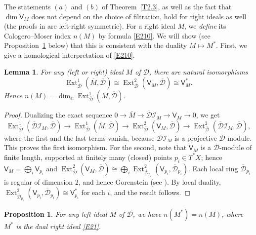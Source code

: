 \documentclass[11pt,reqno]{amsart}
\theoremstyle{plain}
\newtheorem{lemma}{Lemma}[section]
\newtheorem{proposition}{Proposition}[section]
\theoremstyle{definition}
\theoremstyle{remark}
\numberwithin{equation}{section}
\newcommand{\cD}{\mathcal{D}}
\newcommand{\C}{\mathbb{C}}
\newcommand{\bD}{\overline{\cD}}
\newcommand{\bM}{\overline{M}}
\DeclareMathOperator{\Ext}{Ext}
\begin{document}
The statements $(a)$ and $(b)$ of Theorem~\ref{T2.3}, as well as the fact that
$\dim \mathsf{V}_M$ does not depend on the choice of filtration, hold for right ideals as well (the proofs in
\cite{BerestWilson09} are left-right symmetric). For a right ideal $M$, we \emph{define} its
Calogero--Moser index $n(M)$ by formula \eqref{E210}. We will show (see
Proposition~\ref{P2.2} below) that this is consistent with the duality $M \mapsto M^*$. First, we
give a homological interpretation of \eqref{E210}.

\begin{lemma}
\label{L2.7}
For any (left or right) ideal $M$ of $\cD$, there are natural isomorphisms
\[
  \Ext^1_{\bD}(\bM, \bD) \cong \Ext^2_{\bD}(\mathsf{V}_M, \bD) \cong \mathsf{V}_M^* .
\]
Hence $n(M) = \dim_{\C} \Ext^1_{\bD}(\bM, \bD)$.
\end{lemma}

\begin{proof}
Dualizing the exact sequence $0 \to \bM \to \bD \mathcal{I}_M \to \mathsf{V}_M \to 0$, we get
\[
  \Ext^1_{\bD}(\bD \mathcal{I}_M, \bD) \to \Ext^1_{\bD}(\bM, \bD) \to
  \Ext^2_{\bD}(\mathsf{V}_M, \bD) \to \Ext^2_{\bD}(\bD \mathcal{I}_M, \bD) ,
\]
where the first and the last terms vanish, because $\bD \mathcal{I}_M$ is a projective
$\bD$-module. This proves the first isomorphism. For the second, note that $\mathsf{V}_M$ is a
$\bD$-module of finite length, supported at finitely many (closed) points $p_i \in T^*X$; hence
$\mathsf{V}_M = \bigoplus_i \mathsf{V}_{p_i}$ and $\Ext^2_{\bD}(\mathsf{V}_M, \bD) \cong
\bigoplus_i \Ext^2_{\bD_{p_i}}(\mathsf{V}_{p_i}, \bD_{p_i})$. Each local ring $\bD_{p_i}$ is
regular of dimension $2$, and hence Gorenstein (see \cite[Proposition~3.1.20]{BrunsHerzog98}). By
local duality, $\Ext^2_{\bD_{p_i}}(\mathsf{V}_{p_i}, \bD_{p_i}) \cong \mathsf{V}_{p_i}^*$ for
each $i$, and the result follows.
\end{proof}

\begin{proposition}
\label{P2.2}
For any left ideal $M$ of $\cD$, we have $n(M^*) = n(M)$, where $M^*$ is the dual right ideal
\eqref{E21}.
\end{proposition}
\end{document}
